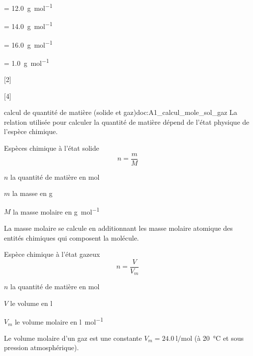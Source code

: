 \begin{donnees}[2]
  \item {} = \qty{12,0}{\g\per\mole}
  \item {} = \qty{14,0}{\g\per\mole}
  \item {} = \qty{16,0}{\g\per\mole}
  \item {} = \qty{1,0}{\g\per\mole}
\end{donnees}

[2]

[4]


\begin{doc}{calcul de quantité de matière (solide et gaz)}{doc:A1_calcul_mole_sol_gaz}
  La relation utilisée pour calculer la quantité de matière dépend de l'état physique de l'espèce chimique.
  \begin{multicols}{2}
    Espèces chimique à l'état solide
    \begin{equation*}
      n = \dfrac{m}{M}
    \end{equation*}
    \begin{listePoints}
      \item $n$ la quantité de matière en \unit{\mole}
      \item $m$ la masse en \unit{\g}
      \item $M$ la masse molaire en \unit{\g\per\mole}
    \end{listePoints}
    La masse molaire se calcule en additionnant les masse molaire atomique des entités chimiques qui composent la molécule.
    
    Espèce chimique à l'état gazeux
    \begin{equation*}
      n = \dfrac{V}{V_m}
    \end{equation*}
    \begin{listePoints}
      \item $n$ la quantité de matière en \unit{\mole}
      \item $V$ le volume en \unit{\litre}
      \item $V_m$ le volume molaire en \unit{\litre\per\mole}
    \end{listePoints}
    Le volume molaire d'un gaz est une constante $V_m = \qty{24,0}{\litre\per\mole}$ (à \qty{20}{\degreeCelsius} et sous pression atmosphérique).
  \end{multicols}
\end{doc}

